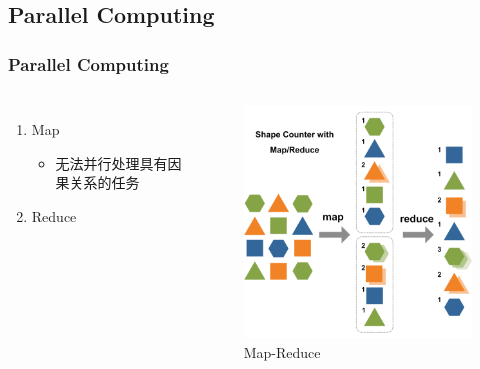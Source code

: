 \subsection{Parallel Computing}
\begin{frame}
  \frametitle{Parallel Computing}
  \begin{columns}
    \begin{enumerate}
      \item Map
        \begin{itemize}
          \item 无法并行处理具有因果关系的任务
        \end{itemize}
      \item Reduce
    \end{enumerate}
    \begin{figure}
      \includegraphics[scale=.4]{images/mapreduce_small.png}
      \caption{Map-Reduce}
      \label{mapreduce}
    \end{figure}
  \end{columns}
\end{frame}

